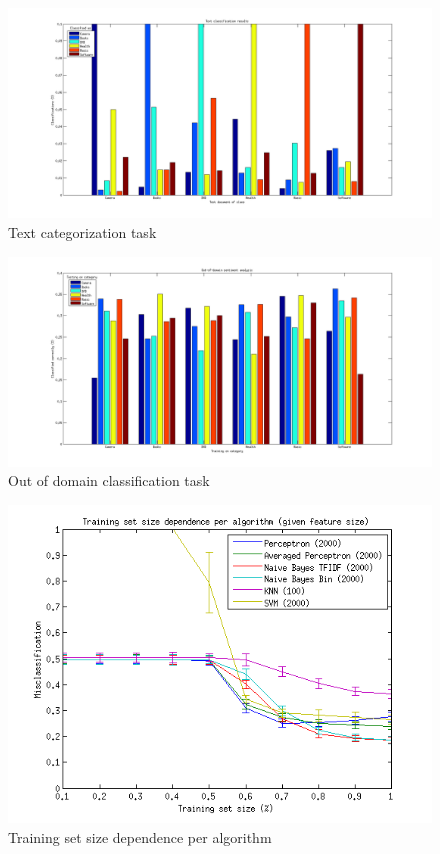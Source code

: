 \begin{figure}[H]
\centering
\includegraphics[scale = 0.3]{../Plottar/text_categorization.png}
\caption{Text categorization task}
\label{fig:trainingsize}
\end{figure} 

\begin{figure}[H]
\centering
\includegraphics[scale = 0.3]{../Plottar/outofdomain.png}
\caption{Out of domain classification task}
\label{fig:trainingsize}
\end{figure} 



\begin{figure}[H]
\centering
\includegraphics[scale = 0.8]{../Plottar/training_size_k_2000allknn_100.png}
\caption{Training set size dependence per algorithm}
\label{fig:trainingsize}
\end{figure} 
